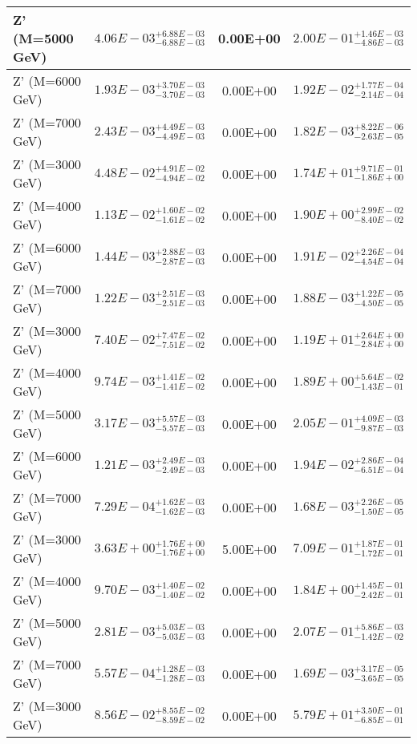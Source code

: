 \documentclass{article}
\begin{document}
\begin{center}
\begin{tabular}{ |l|c|c|c| }
 \hline
 Z' (M=5000 GeV) & $4.06E-03^{+6.88E-03}_{-6.88E-03}$ & 0.00E+00 & $2.00E-01^{+1.46E-03}_{-4.86E-03}$ \\
 \hline
 Z' (M=6000 GeV) & $1.93E-03^{+3.70E-03}_{-3.70E-03}$ & 0.00E+00 & $1.92E-02^{+1.77E-04}_{-2.14E-04}$ \\
 \hline
 Z' (M=7000 GeV) & $2.43E-03^{+4.49E-03}_{-4.49E-03}$ & 0.00E+00 & $1.82E-03^{+8.22E-06}_{-2.63E-05}$ \\
 \hline
 Z' (M=3000 GeV) & $4.48E-02^{+4.91E-02}_{-4.94E-02}$ & 0.00E+00 & $1.74E+01^{+9.71E-01}_{-1.86E+00}$ \\
 \hline
 Z' (M=4000 GeV) & $1.13E-02^{+1.60E-02}_{-1.61E-02}$ & 0.00E+00 & $1.90E+00^{+2.99E-02}_{-8.40E-02}$ \\
 \hline
 Z' (M=6000 GeV) & $1.44E-03^{+2.88E-03}_{-2.87E-03}$ & 0.00E+00 & $1.91E-02^{+2.26E-04}_{-4.54E-04}$ \\
 \hline
 Z' (M=7000 GeV) & $1.22E-03^{+2.51E-03}_{-2.51E-03}$ & 0.00E+00 & $1.88E-03^{+1.22E-05}_{-4.50E-05}$ \\
 \hline
 Z' (M=3000 GeV) & $7.40E-02^{+7.47E-02}_{-7.51E-02}$ & 0.00E+00 & $1.19E+01^{+2.64E+00}_{-2.84E+00}$ \\
 \hline
 Z' (M=4000 GeV) & $9.74E-03^{+1.41E-02}_{-1.41E-02}$ & 0.00E+00 & $1.89E+00^{+5.64E-02}_{-1.43E-01}$ \\
 \hline
 Z' (M=5000 GeV) & $3.17E-03^{+5.57E-03}_{-5.57E-03}$ & 0.00E+00 & $2.05E-01^{+4.09E-03}_{-9.87E-03}$ \\
 \hline
 Z' (M=6000 GeV) & $1.21E-03^{+2.49E-03}_{-2.49E-03}$ & 0.00E+00 & $1.94E-02^{+2.86E-04}_{-6.51E-04}$ \\
 \hline
 Z' (M=7000 GeV) & $7.29E-04^{+1.62E-03}_{-1.62E-03}$ & 0.00E+00 & $1.68E-03^{+2.26E-05}_{-1.50E-05}$ \\
 \hline
 Z' (M=3000 GeV) & $3.63E+00^{+1.76E+00}_{-1.76E+00}$ & 5.00E+00 & $7.09E-01^{+1.87E-01}_{-1.72E-01}$ \\
 \hline
 Z' (M=4000 GeV) & $9.70E-03^{+1.40E-02}_{-1.40E-02}$ & 0.00E+00 & $1.84E+00^{+1.45E-01}_{-2.42E-01}$ \\
 \hline
 Z' (M=5000 GeV) & $2.81E-03^{+5.03E-03}_{-5.03E-03}$ & 0.00E+00 & $2.07E-01^{+5.86E-03}_{-1.42E-02}$ \\
 \hline
 Z' (M=7000 GeV) & $5.57E-04^{+1.28E-03}_{-1.28E-03}$ & 0.00E+00 & $1.69E-03^{+3.17E-05}_{-3.65E-05}$ \\
 \hline
 Z' (M=3000 GeV) & $8.56E-02^{+8.55E-02}_{-8.59E-02}$ & 0.00E+00 & $5.79E+01^{+3.50E-01}_{-6.85E-01}$ \\

\end{tabular}
\end{center}
\end{document}
